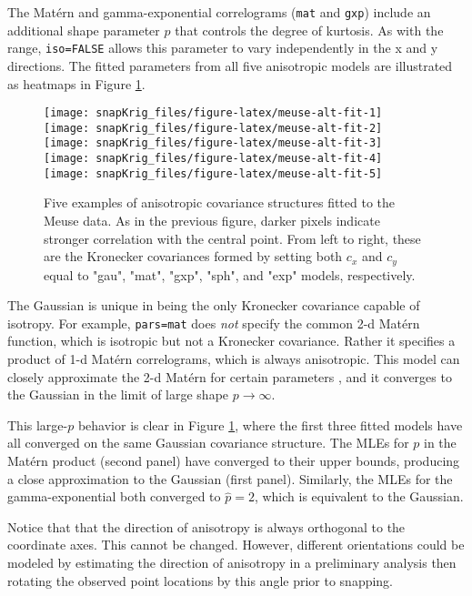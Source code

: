 The Matérn and gamma-exponential correlograms (\texttt{\textquotesingle{}mat\textquotesingle{}} and \texttt{\textquotesingle{}gxp\textquotesingle{}}) include an additional shape parameter \(p\) that controls the degree of kurtosis. As with the range, \texttt{iso=FALSE} allows this parameter to vary independently in the x and y directions. The fitted parameters from all five anisotropic models are illustrated as heatmaps in Figure \ref{fig:meuse-alt-fit}.

\begin{figure}[!htb]
\texttt{[image: snapKrig\_files/figure-latex/meuse-alt-fit-1]} \texttt{[image: snapKrig\_files/figure-latex/meuse-alt-fit-2]} \texttt{[image: snapKrig\_files/figure-latex/meuse-alt-fit-3]} \texttt{[image: snapKrig\_files/figure-latex/meuse-alt-fit-4]} \texttt{[image: snapKrig\_files/figure-latex/meuse-alt-fit-5]} \caption{Five examples of anisotropic covariance structures fitted to the Meuse data. As in the previous figure, darker pixels indicate stronger correlation with the central point. From left to right, these are the Kronecker covariances formed by setting both $c_x$ and $c_y$ equal to "gau", "mat", "gxp", "sph", and "exp" models, respectively.}\label{fig:meuse-alt-fit}
\end{figure}

The Gaussian is unique in being the only Kronecker covariance capable of isotropy. For example, \texttt{pars=\textquotesingle{}mat\textquotesingle{}} does \emph{not} specify the common 2-d Matérn function, which is isotropic but not a Kronecker covariance. Rather it specifies a product of 1-d Matérn correlograms, which is always anisotropic. This model can closely approximate the 2-d Matérn for certain parameters \citep{koch2020unifying}, and it converges to the Gaussian in the limit of large shape \(p\to\infty\).

This large-\(p\) behavior is clear in Figure \ref{fig:meuse-alt-fit}, where the first three fitted models have all converged on the same Gaussian covariance structure. The MLEs for \(p\) in the Matérn product (second panel) have converged to their upper bounds, producing a close approximation to the Gaussian (first panel). Similarly, the MLEs for the gamma-exponential both converged to \(\hat{p}=2\), which is equivalent to the Gaussian.

Notice that that the direction of anisotropy is always orthogonal to the coordinate axes. This cannot be changed. However, different orientations could be modeled by estimating the direction of anisotropy in a preliminary analysis \citep[\emph{eg.} by the method of][]{koch2020computationally} then rotating the observed point locations by this angle prior to snapping.

